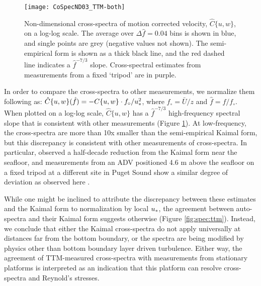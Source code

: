\begin{figure}[t]
  \centering
  \texttt{[image: CoSpecND03\_TTM-both]}
  \caption{Non-dimensional cross-spectra of motion corrected velocity, $\hat{C}\{u,w\}$, on a log-log scale. The average over $\Delta \hat{f} = 0.04$ bins is shown in blue, and single points are grey (negative values not shown). The semi-empirical \cite{Kaimal++1972} form is shown as a thick black line, and the red dashed line indicates a $\hat{f}^{-7/3}$ slope. Cross-spectral estimates from measurements from a fixed `tripod' are in purple.}
  \label{fig:cspecnd:ttm}
\end{figure}

In order to compare the cross-spectra to other measurements, we normalize them following \cite{Kaimal++1972} as: $\hat{C}\{u,w\}(\hat{f}) = -C\{u,w\} \cdot f_\circ / u_*^2$, where $f_\circ = \bar{U} / z$ and $\hat{f} = f / f_\circ$. 
When plotted on a log-log scale, $\hat{C}\lbrace u,w \rbrace$ has a $\hat{f}^{-7/3}$ high-frequency spectral slope that is consistent with other measurements (Figure \ref{fig:cspecnd:ttm}). At low-frequency, the cross-spectra are more than 10x smaller than the semi-empirical Kaimal form, but this discrepancy is consistent with other measurements of cross-spectra. In particular, \cite{Walter++2011} observed a half-decade reduction from the Kaimal form near the seafloor, and measurements from an ADV positioned 4.6 m above the seafloor on a fixed tripod at a different site in Puget Sound show a similar degree of deviation as observed here \cite[]{Thomson++2012}. 

While one might be inclined to attribute the discrepancy between these estimates and the Kaimal form to normalization by local $u_*$, the agreement between auto-spectra and their Kaimal form suggests otherwise (Figure \ref{fig:spec:ttm}). Instead, we conclude that either the Kaimal cross-spectra do not apply universally at distances far from the bottom boundary, or the spectra are being modified by physics other than bottom boundary layer driven turbulence. Either way, the agreement of TTM-measured cross-spectra with measurements from stationary platforms is interpreted as an indication that this platform can resolve cross-spectra and Reynold's stresses.

